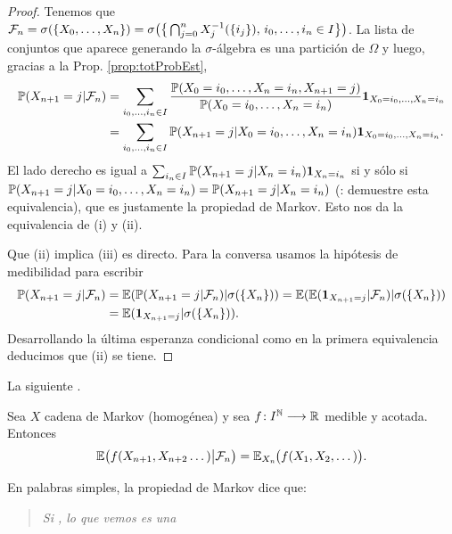 \begin{proof}
Tenemos que $\mathcal{F}_n=\sigma(\{X_0,\dotsc,X_n\})=\sigma\big(\big\{\bigcap_{j=0}^nX_j^{-1}(\{i_j\}),\,i_0,\dotsc,i_n\in I\big\}\big)$.
La lista de conjuntos que aparece generando la $\sigma$-álgebra es una partición de $\Omega$ y luego, gracias a la Prop. \ref{prop:totProbEst},
\begin{align}
\mathbb{P}(X_{n+1}=j|\mathcal{F}_n)&=\sum_{i_0,\dotsc,i_n\in I}\frac{\mathbb{P}(X_0=i_0,\dotsc,X_n=i_n,X_{n+1}=j)}{\mathbb{P}(X_0=i_0,\dotsc,X_n=i_n)}\mathbf{1}_{X_0=i_0,\dotsc,X_n=i_n}\\
&=\sum_{i_0,\dotsc,i_n\in I}\mathbb{P}(X_{n+1}=j|X_0=i_0,\dotsc,X_n=i_n)\mathbf{1}_{X_0=i_0,\dotsc,X_n=i_n}.
\end{align}
El lado derecho es igual a $\sum_{i_n\in I}\mathbb{P}(X_{n+1}=j|X_n=i_n)\mathbf{1}_{X_n=i_n}$ si y sólo si $\mathbb{P}(X_{n+1}=j|X_0=i_0,\dotsc,X_n=i_n)=\mathbb{P}(X_{n+1}=j|X_n=i_n)$ (\uexers: demuestre esta equivalencia), que es justamente la propiedad de Markov.
Esto nos da la equivalencia de (i) y (ii).

Que (ii) implica (iii) es directo.
Para la conversa usamos la hipótesis de medibilidad para escribir
\begin{align}
\mathbb{P}(X_{n+1}=j|\mathcal{F}_n)&=\mathbb{E}(\mathbb{P}(X_{n+1}=j|\mathcal{F}_n)|\sigma(\{X_n\}))=\mathbb{E}(\mathbb{E}(\mathbf{1}_{X_{n+1}=j}|\mathcal{F}_n)|\sigma(\{X_n\}))\\
&=\mathbb{E}(\mathbf{1}_{X_{n+1}=j}|\sigma(\{X_n\})).
\end{align}
Desarrollando la última esperanza condicional como en la primera equivalencia deducimos que (ii) se tiene.
\end{proof}

La siguiente .

\begin{thm}\label{thm:propMarkGen}
Sea $X$ cadena de Markov (homogénea) y sea $f\!:I^{\mathbb{N}}\longrightarrow\mathbb{R}$ medible y acotada.
Entonces
\[\mathbb{E}\big(f(X_{n+1},X_{n+2}\dotsc)\big|\mathcal{F}_n\big)=\mathbb{E}_{X_n}\hspace{-0.1em}\big(f(X_1,X_2,\dotsc)\big).\]
\end{thm}

En palabras simples, la propiedad de Markov dice que:
\begin{quote}
\emph{Si , lo que vemos es una }
\end{quote}

